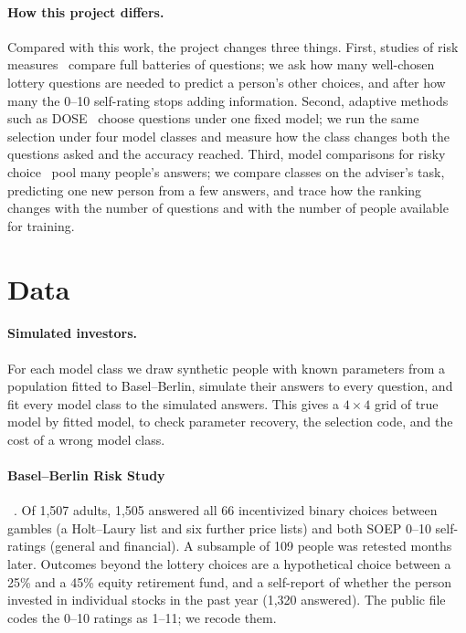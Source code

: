 \documentclass{article}
\begin{document}
\paragraph{How this project differs.}
Compared with this work, the project changes three things. First, studies of risk measures~\citep{dohmen2011,frey2017,pedroni2017} compare full batteries of questions; we ask how many well-chosen lottery questions are needed to predict a person's other choices, and after how many the 0--10 self-rating stops adding information. Second, adaptive methods such as DOSE~\citep{chapman2018dose} choose questions under one fixed model; we run the same selection under four model classes and measure how the class changes both the questions asked and the accuracy reached. Third, model comparisons for risky choice~\citep{bourgin2019,peterson2021,fudenberg2022} pool many people's answers; we compare classes on the adviser's task, predicting one new person from a few answers, and trace how the ranking changes with the number of questions and with the number of people available for training.

\section{Data}

\paragraph{Simulated investors.}
For each model class we draw synthetic people with known parameters from a population fitted to Basel--Berlin, simulate their answers to every question, and fit every model class to the simulated answers. This gives a $4 \times 4$ grid of true model by fitted model, to check parameter recovery, the selection code, and the cost of a wrong model class.

\paragraph{Basel--Berlin Risk Study}~\citep[OSF, CC BY 4.0]{frey2017}.
Of 1,507 adults, 1,505 answered all 66 incentivized binary choices between gambles (a Holt--Laury list and six further price lists) and both SOEP 0--10 self-ratings (general and financial). A subsample of 109 people was retested months later. Outcomes beyond the lottery choices are a hypothetical choice between a 25\% and a 45\% equity retirement fund, and a self-report of whether the person invested in individual stocks in the past year (1,320 answered). The public file codes the 0--10 ratings as 1--11; we recode them.
\end{document}
